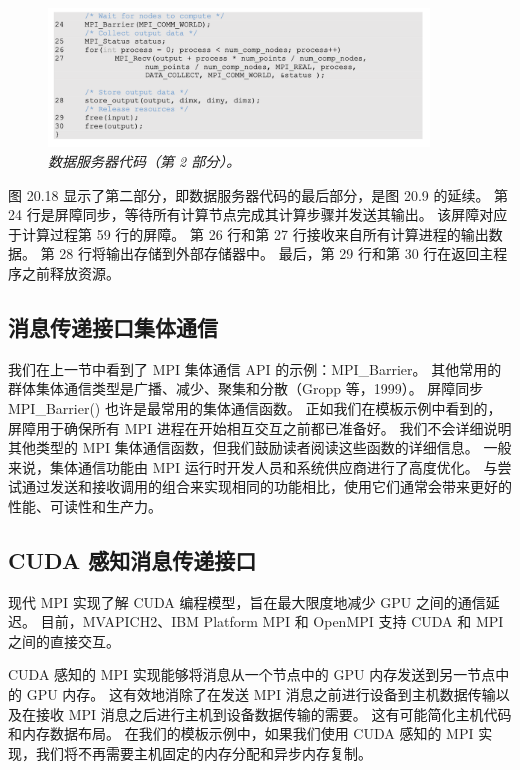 \begin{figure}[H]
	\centering
	\includegraphics[width=0.9\textwidth]{figs/F20.18.png}
	\caption{\textit{数据服务器代码（第 2 部分）。}}
\end{figure}

图 20.18 显示了第二部分，即数据服务器代码的最后部分，是图 20.9 的延续。 
第 24 行是屏障同步，等待所有计算节点完成其计算步骤并发送其输出。 该屏障对应于计算过程第 59 行的屏障。 
第 26 行和第 27 行接收来自所有计算进程的输出数据。 第 28 行将输出存储到外部存储器中。 
最后，第 29 行和第 30 行在返回主程序之前释放资源。

\subsection{消息传递接口集体通信}
我们在上一节中看到了 MPI 集体通信 API 的示例：MPI\_Barrier。 
其他常用的群体集体通信类型是广播、减少、聚集和分散（Gropp 等，1999）。 
屏障同步 MPI\_Barrier() 也许是最常用的集体通信函数。 
正如我们在模板示例中看到的，屏障用于确保所有 MPI 进程在开始相互交互之前都已准备好。 
我们不会详细说明其他类型的 MPI 集体通信函数，但我们鼓励读者阅读这些函数的详细信息。 
一般来说，集体通信功能由 MPI 运行时开发人员和系统供应商进行了高度优化。 
与尝试通过发送和接收调用的组合来实现相同的功能相比，使用它们通常会带来更好的性能、可读性和生产力。

\subsection{CUDA 感知消息传递接口}
现代 MPI 实现了解 CUDA 编程模型，旨在最大限度地减少 GPU 之间的通信延迟。 
目前，MVAPICH2、IBM Platform MPI 和 OpenMPI 支持 CUDA 和 MPI 之间的直接交互。

CUDA 感知的 MPI 实现能够将消息从一个节点中的 GPU 内存发送到另一节点中的 GPU 内存。 
这有效地消除了在发送 MPI 消息之前进行设备到主机数据传输以及在接收 MPI 消息之后进行主机到设备数据传输的需要。 
这有可能简化主机代码和内存数据布局。 
在我们的模板示例中，如果我们使用 CUDA 感知的 MPI 实现，我们将不再需要主机固定的内存分配和异步内存复制。

